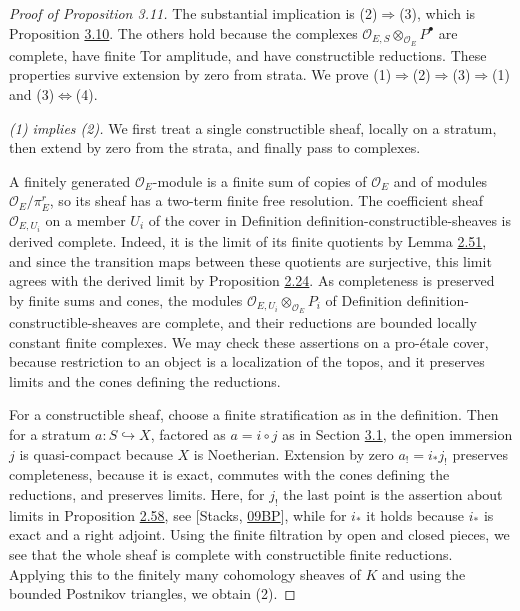 \documentclass[11pt]{article}
\begin{document}
\begin{proof}[{Proof of Proposition 3.11}]\label{bp228}%
The substantial implication is (2)\(\Rightarrow\)(3), which is Proposition \hyperref[bp223]{3.10}. The others hold because the complexes \(\mathcal O_{E,S}\otimes_{\mathcal O_E}P^\bullet\) are complete, have finite Tor amplitude, and have constructible reductions. These properties survive extension by zero from strata. We prove (1)\(\Rightarrow\)(2)\(\Rightarrow\)(3)\(\Rightarrow\)(1) and (3)\(\Leftrightarrow\)(4).

\emph{(1) implies (2).} We first treat a single constructible sheaf, locally on a stratum, then extend by zero from the strata, and finally pass to complexes.

A finitely generated \(\mathcal O_E\)-module is a finite sum of copies of \(\mathcal O_E\) and of modules \(\mathcal O_E/\pi_E^r\), so its sheaf has a two-term finite free resolution. The coefficient sheaf \(\mathcal O_{E,U_i}\) on a member \(U_i\) of the cover in Definition definition-constructible-sheaves is derived complete. Indeed, it is the limit of its finite quotients by Lemma \hyperref[bp158]{2.51}, and since the transition maps between these quotients are surjective, this limit agrees with the derived limit by Proposition \hyperref[bp71]{2.24}. As completeness is preserved by finite sums and cones, the modules \(\mathcal O_{E,U_i}\otimes_{\mathcal O_E}P_i\) of Definition definition-constructible-sheaves are complete, and their reductions are bounded locally constant finite complexes. We may check these assertions on a pro-étale cover, because restriction to an object is a localization of the topos, and it preserves limits and the cones defining the reductions.

For a constructible sheaf, choose a finite stratification as in the definition. Then for a stratum \(a:S\hookrightarrow X\), factored as \(a=i\circ j\) as in Section \hyperref[bp195]{3.1}, the open immersion \(j\) is quasi-compact because \(X\) is Noetherian. Extension by zero \(a_!=i_*j_!\) preserves completeness, because it is exact, commutes with the cones defining the reductions, and preserves limits. Here, for \(j_!\) the last point is the assertion about limits in Proposition \hyperref[bp181]{2.58}, see [Stacks, \href{https://stacks.math.columbia.edu/tag/09BP}{09BP}], while for \(i_*\) it holds because \(i_*\) is exact and a right adjoint. Using the finite filtration by open and closed pieces, we see that the whole sheaf is complete with constructible finite reductions. Applying this to the finitely many cohomology sheaves of \(K\) and using the bounded Postnikov triangles, we obtain (2).


\end{proof}
\end{document}
